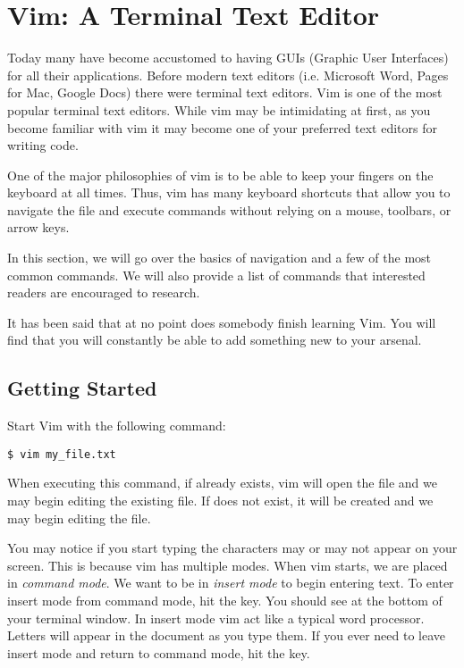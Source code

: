\section*{Vim: A Terminal Text Editor}
Today many have become accustomed to having GUIs (Graphic User Interfaces) for all their applications. 
Before modern text editors (i.e. Microsoft Word, Pages for Mac, Google Docs) there were terminal text editors. 
Vim is one of the most popular terminal text editors. 
While vim may be intimidating at first, as you become familiar with vim it may become one of your preferred text editors for writing code.

One of the major philosophies of vim is to be able to keep your fingers on the keyboard at all times. 
Thus, vim has many keyboard shortcuts that allow you to navigate the file and execute commands without relying on a mouse, toolbars, or arrow keys.

In this section, we will go over the basics of navigation and a few of the most common commands. 
We will also provide a list of commands that interested readers are encouraged to research. 

It has been said that at no point does somebody finish learning Vim. 
You will find that you will constantly be able to add something new to your arsenal.

\subsection*{Getting Started}

Start Vim with the following command:

\begin{lstlisting}
$ vim my_file.txt
\end{lstlisting}

When executing this command, if  already exists, vim will open the file and we may begin editing the existing file.
If  does not exist, it will be created and we may begin editing the file.

You may notice if you start typing the characters may or may not appear on your screen.
This is because vim has multiple modes.
When vim starts, we are placed in \emph{command mode}.
We want to be in \emph{insert mode} to begin entering text.
To enter insert mode from command mode, hit the  key.
You should see  at the bottom of your terminal window.
In insert mode vim act like a typical word processor.
Letters will appear in the document as you type them.
If you ever need to leave insert mode and return to command mode, hit the  key.

